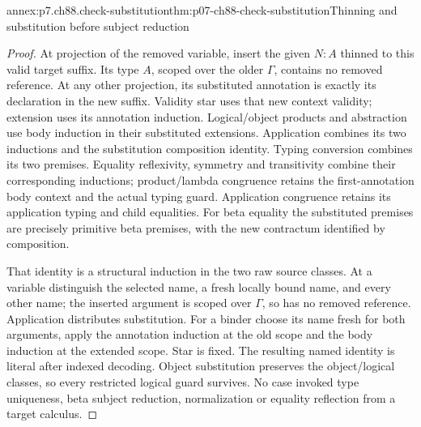 \begin{annexitem}{annex:p7.ch88.check-substitution}{thm:p07-ch88-check-substitution}{Thinning and substitution before subject reduction}
\begin{proof}
At projection of the removed variable, insert the given \(N:A\)
thinned to this valid target suffix. Its type \(A\), scoped over
the older \(\Gamma\), contains no removed reference. At any other
projection, its substituted annotation is exactly its declaration
in the new suffix. Validity star uses that new context validity;
extension uses its annotation induction. Logical/object products
and abstraction use body induction in their substituted extensions.
Application combines its two inductions and the substitution
composition identity. Typing conversion combines its two premises.
Equality reflexivity, symmetry and transitivity combine their
corresponding inductions; product/lambda congruence retains the
first-annotation body context and the actual typing guard. Application
congruence retains its application typing and child equalities.
For beta equality the substituted premises are precisely primitive
beta premises, with the new contractum identified by composition.

That identity is a structural induction in the two raw source classes.
At a variable distinguish the selected name, a fresh locally bound
name, and every other name; the inserted argument is scoped over
\(\Gamma\), so has no removed reference. Application distributes
substitution. For a binder choose its name fresh for both arguments,
apply the annotation induction at the old scope and the body induction
at the extended scope. Star is fixed. The resulting named identity
is literal after indexed decoding. Object substitution preserves
the object/logical classes, so every restricted logical guard
survives. No case invoked type uniqueness, beta subject reduction,
normalization or equality reflection from a target calculus.
\end{proof}
\end{annexitem}

